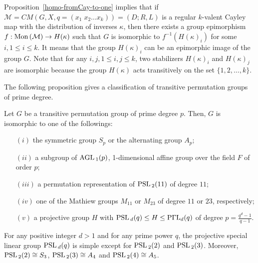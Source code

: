 \documentclass[12pt]{amsart}
\begin{document}
Proposition~\ref{homo-fromCay-to-one} implies that if $\mathcal{
M} = CM(G, X, q = (x_1\;x_2 \ldots x_k) ) = (D;R,L)$ is a regular
$k$-valent Cayley map  with the distribution of inverses $\kappa$,
then there exists a group epimorphism $f: {\mbox{\rm Mon\,}}(\mathcal{ M})
\rightarrow H(\kappa)$ such that $G$ is isomorphic to
$f^{-1}(H(\kappa)_{i})$ for some $i, 1\le i\le k$. It means
that the group $H(\kappa)_i$ can be an epimorphic image of the
group $G$. Note that for any $i,j, 1\le i,j\le k$, two stabilizers
$H(\kappa)_i$ and $H(\kappa)_j$ are isomorphic because the group
$H(\kappa)$ acts transitively on the set $\{1,2,\ldots,k\}$.

The following proposition gives a classification of transitive
permutation groups of prime degree.

\begin{prop} \label{prime-deg-pergp}
Let $G$ be a transitive permutation group of prime degree $p$.
Then, $G$ is isomorphic to one of the followings:
\begin{enumerate}
\item[$(i)$] the symmetric group $S_p$ or the alternating group
$A_p$;

 \item[$(ii)$] a subgroup of ${\mbox{\rm AGL\,}}_1(p)$,
1-dimensional
 affine group over the field $F$ of order $p$;

\item[$(iii)$] a permutation representation of ${\mbox{\rm PSL\,}}_2(11)$ of
degree $11$;

 \item[$(iv)$] one of the Mathiew groups
$M_{11}$ or $M_{23}$ of degree $11$ or $23$,
respectively;

 \item[$(v)$] a projective group $H$
with ${\mbox{\rm PSL\,}}_d(q) \leq H \leq {\rm P}\Gamma {\rm L}_d(q)$ of degree
$p = \frac{q^d-1}{q-1}$.
\end{enumerate}
\end{prop}

\begin{prop} [\cite{LG}] \label{projective-simple}
For any positive integer $d>1$ and for any prime power $q$, the
projective special linear group ${\mbox{\rm PSL\,}}_d(q)$ is simple except for
${\mbox{\rm PSL\,}}_2(2)$ and ${\mbox{\rm PSL\,}}_2(3)$. Moreover,  ${\mbox{\rm PSL\,}}_2(2)
\cong S_3$, ${\mbox{\rm PSL\,}}_2(3) \cong A_4$ and ${\mbox{\rm PSL\,}}_2(4) \cong A_5$.
\end{prop}
\end{document}
